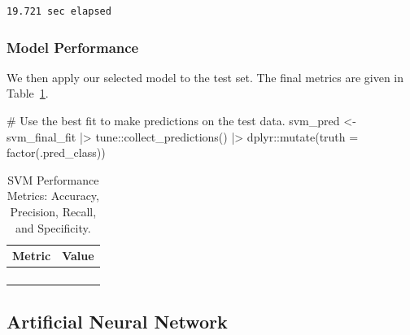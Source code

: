 \documentclass[
  letterpaper,
  DIV=11,
  numbers=noendperiod]{scrartcl}
\newenvironment{Shaded}{\begin{snugshade}}{\end{snugshade}}
\newcommand{\AttributeTok}[1]{\textcolor[rgb]{0.40,0.45,0.13}{#1}}
\newcommand{\CommentTok}[1]{\textcolor[rgb]{0.37,0.37,0.37}{#1}}
\newcommand{\FunctionTok}[1]{\textcolor[rgb]{0.28,0.35,0.67}{#1}}
\newcommand{\NormalTok}[1]{\textcolor[rgb]{0.00,0.23,0.31}{#1}}
\newcommand{\OtherTok}[1]{\textcolor[rgb]{0.00,0.23,0.31}{#1}}
\newcommand{\SpecialCharTok}[1]{\textcolor[rgb]{0.37,0.37,0.37}{#1}}
\begin{document}
\begin{verbatim}
19.721 sec elapsed
\end{verbatim}

\subsubsection{Model Performance}\label{model-performance-1}

We then apply our selected model to the test set. The final metrics are
given in Table~\ref{tbl-svm-performance-pdf}.

\begin{Shaded}
\begin{Highlighting}[]
\CommentTok{\# Use the best fit to make predictions on the test data.}
\NormalTok{svm\_pred }\OtherTok{\textless{}{-}} 
\NormalTok{  svm\_final\_fit }\SpecialCharTok{|\textgreater{}} 
\NormalTok{  tune}\SpecialCharTok{::}\FunctionTok{collect\_predictions}\NormalTok{() }\SpecialCharTok{|\textgreater{}}
\NormalTok{  dplyr}\SpecialCharTok{::}\FunctionTok{mutate}\NormalTok{(}\AttributeTok{truth =} \FunctionTok{factor}\NormalTok{(.pred\_class))}
\end{Highlighting}
\end{Shaded}

\begin{longtable}{>{\raggedright\arraybackslash}p{}>{\raggedleft\arraybackslash}p{}}

\caption{\label{tbl-svm-performance-pdf}SVM Performance Metrics:
Accuracy, Precision, Recall, and Specificity.}

\tabularnewline

\toprule
Metric & Value \\ 
\midrule\addlinespace[2.5pt]
\cellcolor[HTML]{FFFFFF}{Accuracy} & \cellcolor[HTML]{FFFFFF}{78.0} \\ 
\cellcolor[HTML]{FFFFFF}{Precision} & \cellcolor[HTML]{FFFFFF}{23.1} \\ 
\cellcolor[HTML]{FFFFFF}{Recall} & \cellcolor[HTML]{FFFFFF}{100.0} \\ 
\cellcolor[HTML]{FFFFFF}{Specificity} & \cellcolor[HTML]{FFFFFF}{76.5} \\ 
\bottomrule

\end{longtable}

\subsection{Artificial Neural Network}\label{artificial-neural-network}
\end{document}
